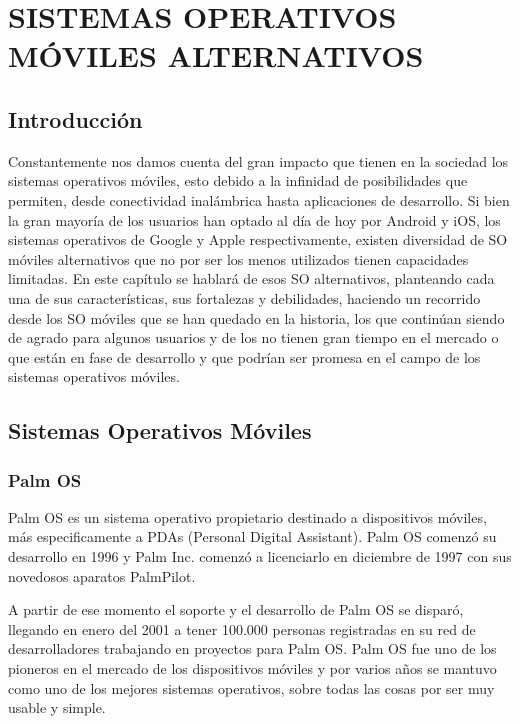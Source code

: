 \chapter*{SISTEMAS OPERATIVOS MÓVILES ALTERNATIVOS}

\section*{Introducción}
Constantemente nos damos cuenta del gran impacto que tienen en la sociedad los sistemas operativos móviles, esto debido a la infinidad de posibilidades que permiten, desde conectividad inalámbrica hasta aplicaciones de desarrollo. Si bien la gran mayoría de los usuarios han optado al día de hoy por Android y iOS, los sistemas operativos de Google y Apple respectivamente, existen diversidad de SO móviles alternativos que no por ser los menos utilizados tienen capacidades limitadas. En este capítulo se hablará de esos SO alternativos, planteando cada una de sus características, sus fortalezas y debilidades, haciendo un recorrido desde los SO móviles que se han quedado en la historia, los que continúan siendo de agrado para algunos usuarios y de los no tienen gran tiempo en el mercado o que están en fase de desarrollo y que podrían ser promesa en el campo de los sistemas operativos móviles.

\section*{Sistemas Operativos Móviles}
\subsection*{Palm OS}
Palm OS es un sistema operativo propietario destinado a dispositivos móviles, más especificamente a PDAs (Personal Digital Assistant). Palm OS comenzó su desarrollo en 1996 y Palm Inc. comenzó a licenciarlo en diciembre de 1997 con sus novedosos aparatos PalmPilot.                                               

A partir de ese momento el soporte y el desarrollo de Palm OS se disparó, llegando en enero del 2001 a tener 100.000 personas registradas en su 
red de desarrolladores trabajando en proyectos para Palm OS. Palm OS fue uno de los pioneros en el mercado de los dispositivos móviles y por 
varios años se mantuvo como uno de los mejores sistemas operativos, sobre todas las cosas por ser muy usable y simple.                                                                                                                                                                                    
                                                                                                                                                                              
